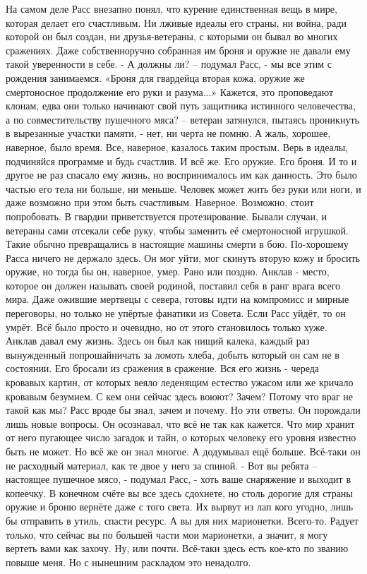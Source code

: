 \documentclass[a4paper, 12pt]{report}
\begin{document}
На самом деле Расс внезапно понял, что курение единственная вещь в мире, которая делает его счастливым. Ни лживые идеалы его страны, ни война, ради которой он был создан, ни друзья-ветераны, с которыми он бывал во многих сражениях. Даже собственноручно собранная им броня и оружие не давали ему такой уверенности в себе.
- А должны ли? – подумал Расс, - мы все этим с рождения занимаемся. «Броня для гвардейца вторая кожа, оружие же смертоносное продолжение его руки и разума...» Кажется, это проповедают клонам, едва они только начинают свой путь защитника истинного человечества, а по совместительству пушечного мяса? – ветеран затянулся, пытаясь проникнуть в вырезанные участки памяти, - нет, ни черта не помню. А жаль, хорошее, наверное, было время. Все, наверное, казалось таким простым. Верь в идеалы, подчиняйся программе и будь счастлив.
  И всё же. Его оружие. Его броня. И то и другое не раз спасало ему жизнь, но воспринималось им как данность. Это было частью его тела ни больше, ни меньше. Человек может жить без руки или ноги, и даже возможно при этом быть счастливым. Наверное. Возможно, стоит попробовать. В гвардии приветствуется протезирование. Бывали случаи, и ветераны сами отсекали себе руку, чтобы заменить её смертоносной игрушкой. Такие обычно превращались в настоящие машины смерти в бою.
	По-хорошему Расса ничего не держало здесь. Он мог уйти, мог скинуть вторую кожу и бросить оружие, но тогда бы он, наверное, умер. Рано или поздно. Анклав - место, которое он должен называть своей родиной, поставил себя в ранг врага всего мира. Даже ожившие мертвецы с севера, готовы идти на компромисс и  мирные переговоры, но только не упёртые фанатики из Совета. Если Расс уйдёт, то он умрёт. Всё было просто и очевидно, но от этого становилось только хуже. Анклав давал ему жизнь. Здесь он был как нищий калека, каждый раз вынужденный попрошайничать за ломоть хлеба, добыть который он сам не в состоянии. Его бросали из сражения в сражение. Вся его жизнь - череда кровавых картин, от которых веяло леденящим естество ужасом или же кричало кровавым безумием. 
	С кем они сейчас здесь воюют? Зачем? Потому что враг не такой как мы? Расс вроде бы знал, зачем и почему. Но эти ответы. Он порождали лишь новые вопросы. Он осознавал, что всё не так как кажется. Что мир хранит от него пугающее число загадок и тайн, о которых человеку его уровня известно быть не может. Но всё же он знал многое. А додумывал ещё больше. Всё-таки он не расходный материал, как те двое у него за спиной.
	- Вот вы ребята – настоящее пушечное мясо, - подумал Расс, - хоть ваше снаряжение и выходит в копеечку. В конечном счёте вы все здесь сдохнете, но столь дорогие для страны оружие и броню вернёте даже с того света. Их вырвут из лап кого угодно, лишь бы отправить в утиль, спасти ресурс. А вы для них марионетки. Всего-то. Радует только, что сейчас вы по большей части мои марионетки, а значит, я могу вертеть вами как захочу. Ну, или почти. Всё-таки здесь есть кое-кто по званию повыше меня. Но с нынешним раскладом это ненадолго. 
\end{document}
